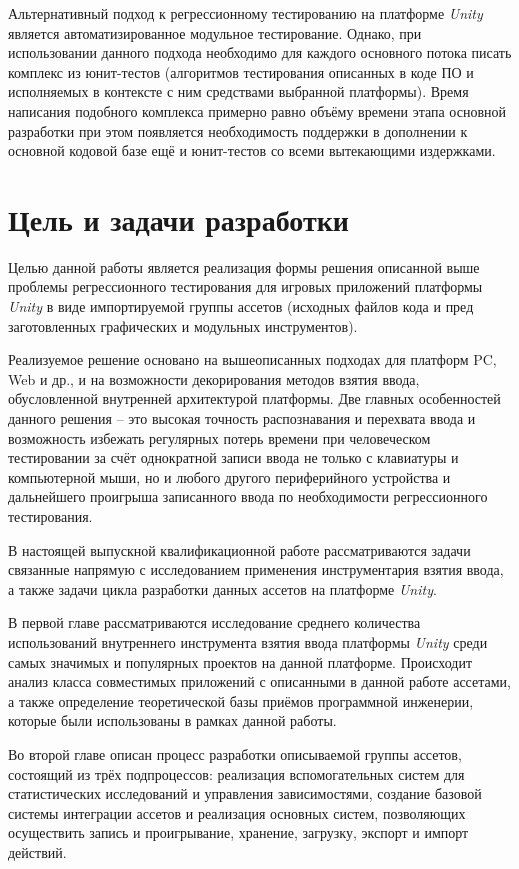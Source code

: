 Альтернативный подход к регрессионному тестированию на платформе \textit{Unity} является автоматизированное модульное тестирование. Однако, при использовании данного подхода необходимо для каждого основного потока писать комплекс из юнит-тестов (алгоритмов тестирования описанных в коде ПО и исполняемых в контексте с ним средствами выбранной платформы). Время написания подобного комплекса примерно равно объёму времени этапа основной разработки при этом появляется необходимость поддержки в дополнении к основной кодовой базе ещё и юнит-тестов со всеми вытекающими издержками.

\section*{Цель и задачи разработки}
Целью данной работы является реализация формы решения описанной выше проблемы регрессионного тестирования для игровых приложений платформы \textit{Unity} в виде импортируемой группы ассетов (исходных файлов кода и пред заготовленных графических и модульных инструментов). 

Реализуемое решение основано на вышеописанных подходах для платформ PC, Web и др., и на возможности декорирования методов взятия ввода, обусловленной внутренней архитектурой платформы. Две главных особенностей данного решения -- это высокая точность распознавания и перехвата ввода и возможность избежать регулярных потерь времени при человеческом тестировании за счёт однократной записи ввода не только с клавиатуры и компьютерной мыши, но и любого другого периферийного устройства и дальнейшего проигрыша записанного ввода по необходимости регрессионного тестирования.

В настоящей выпускной квалификационной работе рассматриваются задачи связанные напрямую с исследованием применения инструментария взятия ввода, а также задачи цикла разработки данных ассетов на платформе \textit{Unity}.

В первой главе рассматриваются исследование среднего количества использований внутреннего инструмента взятия ввода платформы \textit{Unity} среди самых значимых и популярных проектов на данной платформе. Происходит анализ класса совместимых приложений с описанными в данной работе ассетами, а также определение теоретической базы приёмов программной инженерии, которые были использованы в рамках данной работы.

Во второй главе описан процесс разработки описываемой группы ассетов, состоящий из трёх подпроцессов: реализация вспомогательных систем для статистических исследований и управления зависимостями, создание базовой системы интеграции ассетов и реализация основных систем, позволяющих осуществить запись и проигрывание, хранение, загрузку, экспорт и импорт действий.

